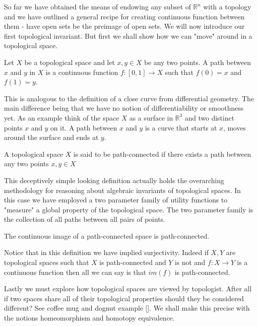 So far we have obtained the means of endowing any subset of $\mathbb{R}^n$ with a topology and we have outlined a general recipe for creating continuous function between them - have open sets be the preimage of open sets. We will now introduce our first topological invariant. But first we shall show how we can "move" around in a topological space. 

\begin{defn} Let $X$ be a topological space and let $x, y \in X$ be any two points. A path between $x$ and $y$ in $X$ is a continuous function $f: [0, 1] \to X$ such that $f(0) = x$ and $f(1) = y$.  \end{defn}

    This is analogous to the definition of a close curve from differential geometry. The main difference being that we have no notion of differentiability or smoothness yet. As an example think of the space $X$ as a surface in $\mathbb{R}^3$ and two distinct points $x$ and $y$ on it. A path between $x$ and $y$ is a curve that starts at $x$, moves around the surface and ends at $y$.

\begin{defn} A topological space $X$ is said to be path-connected if there exists a path between any two points $x, y \in X$  \end{defn}


This deceptively simple looking definition actually holds the overarching methodology for reasoning about algebraic invariants of topological spaces. In this case we have employed a two parameter family of utility functions to "measure" a global property of the topological space. The two parameter family is the collection of all paths between all pairs of points.

\begin{prop} The continuous image of a path-connected space is path-connected. \end{prop}

    Notice that in this definition we have implied surjectivity. Indeed if $X, Y$ are topological spaces such that $X$ is path-connected and $Y$ is not and $f : X \to Y$ is a continuous function then all we can say is that $im(f)$ is path-connected.

Lastly we must explore how topological spaces are viewed by topologist. After all if two spaces share all of their topological properties should they be considered different? See coffee mug and dognut example []. We shall make this precise with the notions homeomorphism and homotopy equivalence.

